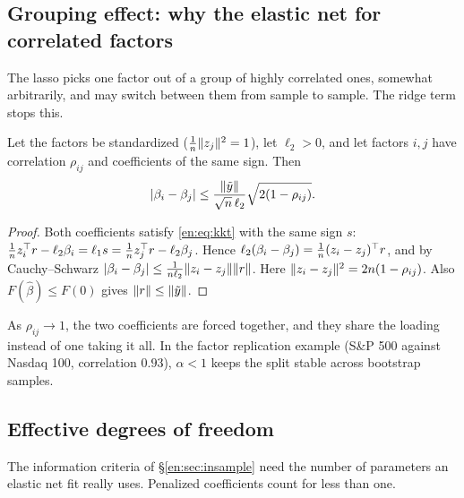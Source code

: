 \subsection{Grouping effect: why the elastic net for correlated factors}

The lasso picks one factor out of a group of highly correlated ones, somewhat arbitrarily,
and may switch between them from sample to sample. The ridge term stops this.

\begin{proposition}[Grouping]\label{en:prop:grouping}
Let the factors be standardized ($\frac1n\lVert z_j\rVert^2=1$), let $\ell_2>0$, and let factors $i,j$
have correlation $\rho_{ij}$ and coefficients of the same sign. Then
\[
  |\beta_i-\beta_j|\le\frac{\lVert \tilde y\rVert}{\sqrt n\,\ell_2}\sqrt{2(1-\rho_{ij})}.
\]
\end{proposition}
\begin{proof}
Both coefficients satisfy \eqref{en:eq:kkt} with the same sign $s$:
$\frac1nz_i^\top r-\ell_2\beta_i=\ell_1s=\frac1nz_j^\top r-\ell_2\beta_j$. Hence
$\ell_2(\beta_i-\beta_j)=\frac1n(z_i-z_j)^\top r$, and by Cauchy--Schwarz
$|\beta_i-\beta_j|\le\frac1{n\ell_2}\lVert z_i-z_j\rVert\lVert r\rVert$. Here
$\lVert z_i-z_j\rVert^2=2n(1-\rho_{ij})$. Also $F(\hat\beta)\le F(0)$ gives
$\lVert r\rVert\le\lVert \tilde y\rVert$.
\end{proof}
As $\rho_{ij}\to1$, the two coefficients are forced together, and they share the loading
instead of one taking it all. In the factor replication example (S\&P 500 against Nasdaq
100, correlation $0.93$), $\alpha<1$ keeps the split stable across bootstrap samples.

\subsection{Effective degrees of freedom}\label{en:sec:df}

The information criteria of \S\ref{en:sec:insample} need the number of parameters an elastic net
fit really uses. Penalized coefficients count for less than one.

